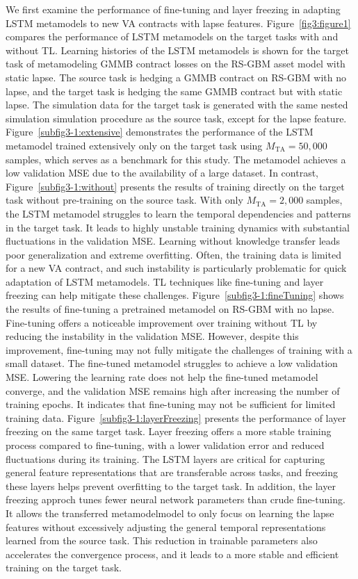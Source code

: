 We first examine the performance of fine-tuning and layer freezing in adapting LSTM metamodels to new VA contracts with lapse features.
Figure~\ref{fig3:figure1} compares the performance of LSTM metamodels on the target tasks with and without TL.
Learning histories of the LSTM metamodels is shown for the target task of metamodeling GMMB contract losses on the RS-GBM asset model with static lapse.
The source task is hedging a GMMB contract on RS-GBM with no lapse, and the target task is hedging the same GMMB contract but with static lapse.
The simulation data for the target task is generated with the same nested simulation simulation procedure as the source task, except for the lapse feature.
Figure~\ref{subfig3-1:extensive} demonstrates the performance of the LSTM metamodel trained extensively only on the target task using $M_{\text{TA}} = 50,\!000$ samples, which serves as a benchmark for this study. 
The metamodel achieves a low validation MSE due to the availability of a large dataset.
In contrast, Figure~\ref{subfig3-1:without} presents the results of training directly on the target task without pre-training on the source task.
With only $M_{\text{TA}} = 2,\!000$ samples, the LSTM metamodel struggles to learn the temporal dependencies and patterns in the target task.
It leads to highly unstable training dynamics with substantial fluctuations in the validation MSE.
Learning without knowledge transfer leads poor generalization and extreme overfitting. 
Often, the training data is limited for a new VA contract, and such instability is particularly problematic for quick adaptation of LSTM metamodels.
TL techniques like fine-tuning and layer freezing can help mitigate these challenges.
Figure~\ref{subfig3-1:fineTuning} shows the results of fine-tuning a pretrained metamodel on RS-GBM with no lapse.
Fine-tuning offers a noticeable improvement over training without TL by reducing the instability in the validation MSE. 
However, despite this improvement, fine-tuning may not fully mitigate the challenges of training with a small dataset.
The fine-tuned metamodel struggles to achieve a low validation MSE.
Lowering the learning rate does not help the fine-tuned metamodel converge, and the validation MSE remains high after increasing the number of training epochs.
It indicates that fine-tuning may not be sufficient for limited training data.
Figure~\ref{subfig3-1:layerFreezing} presents the performance of layer freezing on the same target task.
Layer freezing offers a more stable training process compared to fine-tuning, with a lower validation error and reduced fluctuations during its training.
The LSTM layers are critical for capturing general feature representations that are transferable across tasks, and freezing these layers helps prevent overfitting to the target task.
In addition, the layer freezing approch tunes fewer neural network parameters than crude fine-tuning.
It allows the transferred metamodelmodel to only focus on learning the lapse features without excessively adjusting the general temporal representations learned from the source task.
This reduction in trainable parameters also accelerates the convergence process, and it leads to a more stable and efficient training on the target task.

